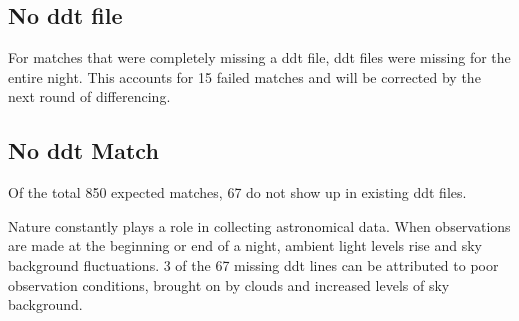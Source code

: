 \documentclass[aps,prb,twocolumn,superscriptaddress]{revtex4-1}
\begin{document}
\subsection{No ddt file}
\indent For matches that were completely missing a ddt file, ddt files were missing 
for the entire night. This accounts for 15 failed matches and will be corrected by 
the next round of differencing.

\subsection{No ddt Match}


Of the total 850 expected matches, 67 do not show up in existing ddt files. 


Nature constantly plays a role in collecting astronomical data. When 
observations are made at the beginning or end of a night, ambient light 
levels rise and sky background fluctuations. 3 of the 67 missing ddt 
lines can be attributed to poor observation conditions, brought on by 
clouds and increased levels of sky background.\\
\end{document}
